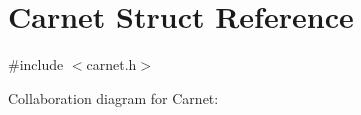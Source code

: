 \hypertarget{structCarnet}{}\section{Carnet Struct Reference}
\label{structCarnet}


{\ttfamily \#include $<$carnet.\+h$>$}



Collaboration diagram for Carnet\+:

